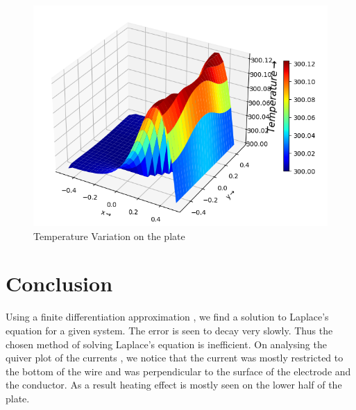 \documentclass{article}
\begin{document}
\begin{figure}[ht!]
\centering
\includegraphics[scale=0.6]{plots/The 3-D surface plot of the Temperature.png}
\caption{Temperature Variation on the plate}
\label{fig:3d Plot of Potential}
\end{figure}


\newpage
\section{Conclusion}
Using a finite differentiation approximation , we find a solution to Laplace’s equation for a given
system. The error is seen to decay very slowly. Thus the chosen method of solving Laplace’s
equation is inefficient. On analysing the quiver plot of the currents , we notice that the current
was mostly restricted to the bottom of the wire and was perpendicular to the surface of the
electrode and the conductor. As a result heating effect is mostly seen on the lower half of the
plate.
\end{document}
